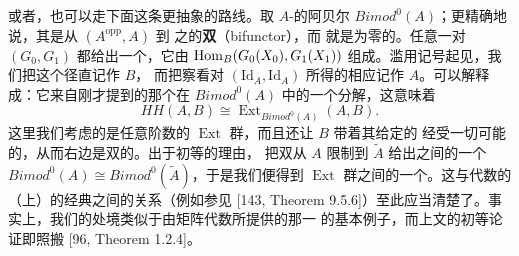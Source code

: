 \begin{remark}\label{thm:morita-bimod-route}
或者，也可以走下面这条更抽象的路线。取\trGraded{} $A$-\trBimodule{}的阿贝尔%
\trCategory{}%
$\mathit{Bimod}^0(A)$；更精确地说，其\trObject{}是从 $(A^{\mathrm{opp}},A)$ 到%
\trGraded\trVectorSpace{}之\trCategory{}的\textbf{双\trFunctor}（bifunctor），而%
\trBimodule{}\trHomomorphism{}就是\trDegree{}为零的\trNaturalTransformation。任意一对%
\trFunctor{} $(G_0,G_1)$ 都给出一个\trBimodule，它由\trVectorSpace{}%
$\operatorname{Hom}_B(G_0(X_0),G_1(X_1))$ 组成。滥用记号起见，我们把这个\trBimodule{}径直记作 $B$，
而把察看\trFunctor{}对 $(\mathrm{Id}_A,\mathrm{Id}_A)$ 所得的相应\trObject{}记作
$A$。\trHochschild{}\trComplex{}可以解释成：它来自刚才提到的那个\trBimodule{}在
$\mathit{Bimod}^0(A)$ 中的一个\trProjective{}分解，这意味着
\begin{equation}\label{eq:hh-as-ext}
\mathit{HH}(A,B)\cong\operatorname{Ext}_{\mathit{Bimod}^0(A)}(A,B).
\end{equation}
这里我们考虑的是任意阶数的 $\operatorname{Ext}$ 群，而且还让 $B$ 带着其给定的%
\trGrading{}经受一切可能的\trSuspension，从而右边是双\trGraded{}的。出于初等的理由，
把双\trFunctor{}从 $A$ 限制到 $\tilde{A}$ 给出\trCategory{}之间的一个\trEquivalence{}%
$\mathit{Bimod}^0(A)\cong\mathit{Bimod}^0(\tilde{A})$，于是我们便得到
$\operatorname{Ext}$ 群之间的一个\trIsomorphism。这与代数的\trHochschild{}%
（上）\trHomology{}的经典\trMorita\trInvariance{}之间的关系（例如参见
[143, Theorem 9.5.6]）至此应当清楚了。事实上，我们的处境类似于由矩阵代数所提供的那一%
\trMorita\trInvariance{}的基本例子，而上文的初等论证即照搬 [96, Theorem 1.2.4]。
\end{remark}
